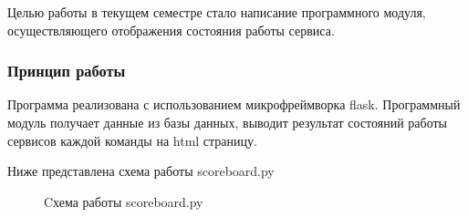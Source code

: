 Целью работы в текущем семестре стало написание программного модуля, осуществляющего отображения состояния работы сервиса.

\subsubsection{Принцип работы}

Программа реализована с использованием микрофреймворка flask. Программный модуль получает данные из базы данных, выводит результат состояний работы сервисов каждой команды на html страницу.

Ниже представлена схема работы scoreboard.py

\begin{figure}[h!]
\caption{Cхема работы scoreboard.py}
\end{figure}

\clearpage